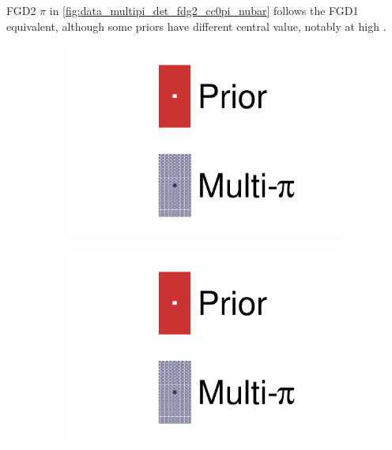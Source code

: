 FGD2 $\pi$ in \autoref{fig:data_multipi_det_fdg2_cc0pi_nubar} follows the FGD1 equivalent, although some priors have different central value, notably at high \pmu.
\begin{figure}[h]
	\centering
	\begin{subfigure}[t]{0.1\textwidth}
		\includegraphics[width=\textwidth,page=1, trim={0mm 120mm 40mm 20mm}, clip]{figures/mach3/2018/data/2018a_FixedCov_RedCov_Mpi_Data_merge_drawPar_withDet}
	\end{subfigure}
	\begin{subfigure}[t]{0.1\textwidth}
		\includegraphics[width=\textwidth,page=1, trim={0mm 20mm 40mm 120mm}, clip]{figures/mach3/2018/data/2018a_FixedCov_RedCov_Mpi_Data_merge_drawPar_withDet}
	\end{subfigure}


\end{figure}
